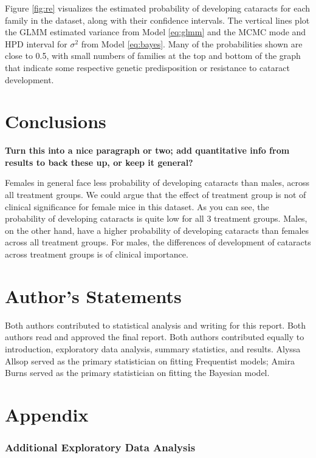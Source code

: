 \documentclass[12pt]{article}
\begin{document}
Figure \ref{fig:re} visualizes the estimated probability of developing cataracts for each family in the dataset, along with their confidence intervals. The vertical lines plot the GLMM estimated variance from Model \eqref{eq:glmm} and the MCMC mode and HPD interval for \(\sigma^2\) from Model \eqref{eq:bayes}. Many of the probabilities shown are close to 0.5, with small numbers of families at the top and bottom of the graph that indicate some respective genetic predisposition or resistance to cataract development.

\section{Conclusions}
\label{sec:conc}

\textbf{Turn this into a nice paragraph or two; add quantitative info from results to back these up, or keep it general?}

Females in general face less probability of developing cataracts than males, across all treatment groups. We could argue that the effect of treatment group is not of clinical significance for female mice in this dataset. As you can see, the probability of developing cataracts is quite low for all 3 treatment groups. Males, on the other hand, have a higher probability of developing cataracts than females across all treatment groups. For males, the differences of development of cataracts across treatment groups is of clinical importance.

\section{Author's Statements}
\label{sec:auth}

Both authors contributed to statistical analysis and writing for this report. Both authors read and approved the final report. Both authors contributed equally to introduction, exploratory data analysis, summary statistics, and results. Alyssa Allsop served as the primary statistician on fitting Frequentist models; Amira Burns served as the primary statistician on fitting the Bayesian model.

\section{Appendix}
\label{sec:appendix}

\hypertarget{additional-exploratory-data-analysis}{%
\subsubsection{Additional Exploratory Data Analysis}\label{additional-exploratory-data-analysis}}
\end{document}
